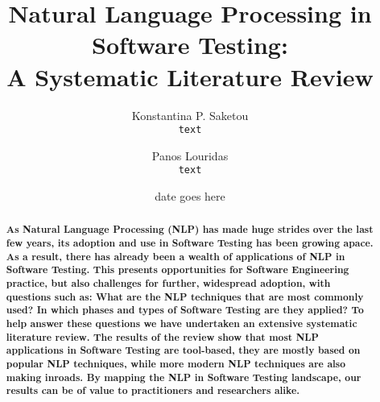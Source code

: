 \documentclass[11pt, notitlepage]{report}
\author{
  Konstantina P. Saketou\\
  \texttt{text}
  \and
  Panos Louridas\\
  \texttt{text}
}
\date{date goes here}
\title{Natural Language Processing in Software Testing:\\ A Systematic Literature Review}
\begin{document}
  \maketitle
  \begin{center} 
              \begin{abstract}
                  \bfseries
                  As Natural Language Processing (NLP) has made huge strides over the
                  last few years, its adoption and use in Software Testing has been
                  growing apace. As a result, there has already been a wealth of
                  applications of NLP in Software Testing. This presents opportunities
                  for Software Engineering practice, but also challenges for further,
                  widespread adoption, with questions such as: What are the NLP
                  techniques that are most commonly used? In which phases and types of
                  Software Testing are they applied? To help answer these questions we
                  have undertaken an extensive systematic literature review. The results
                  of the review show that most NLP applications in Software Testing are
                  tool-based, they are mostly based on popular NLP techniques, while
                  more modern NLP techniques are also making inroads. By mapping the NLP
                  in Software Testing landscape, our results can be of value to
                  practitioners and researchers alike.
              \end{abstract}
  \end{center} 










\end{document}
